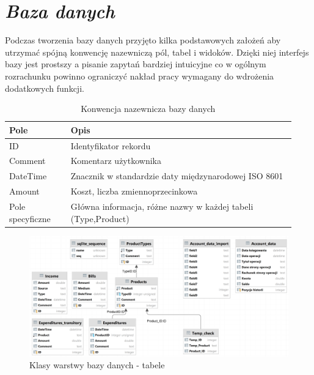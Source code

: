 \documentclass[a4paper,10pt, twoside]{report}
\newcommand{\customstylesection}[1]{\textbf{\textit{#1}}}
\newcommand{\customstyletable}[1]{\footnotesize{\textbf{#1}}}
\begin{document}
\section{\customstylesection{Baza danych}}  \label{Baza danych}
{Podczas tworzenia bazy danych przyjęto kilka podstawowych założeń aby utrzymać 
spójną konwencję nazewniczą pól, tabel i widoków. Dzięki niej interfejs bazy 
jest prostszy a pisanie zapytań bardziej intuicyjne co w ogólnym rozrachunku 
powinno ograniczyć nakład pracy wymagany do wdrożenia dodatkowych funkcji.}

\begin{table}[h]
    \footnotesize
    \begin{tabular}{|p{0.2\linewidth}|p{0.73\linewidth}|}  %
    \hline                  %
    \customstyletable{Pole} & \customstyletable{Opis} \\
    \hline
    {ID} & {Identyfikator rekordu}\\
    \hline
    {Comment} & {Komentarz użytkownika}\\
    \hline
    {DateTime} & {Znacznik w standardzie daty międzynarodowej ISO 8601 \cite{ISO 8601}}\\
    \hline
    {Amount} & {Koszt, liczba zmiennoprzecinkowa}\\
    \hline
    {Pole specyficzne} & {Główna informacja, różne nazwy w każdej tabeli (Type,Product)}\\
    \hline
    \end{tabular}
    \caption{Konwencja nazewnicza bazy danych }
\end{table}

\begin{figure}[H]           %
    \caption{Klasy warstwy bazy danych - tabele}
    \label{fig:Klasy warstwy bazy danych - tabele}
    \centering  
    \includegraphics[width=12cm]{figures/Budgeter_Finances-db_Tables_DataGrid.png}
\end{figure}
\end{document}

